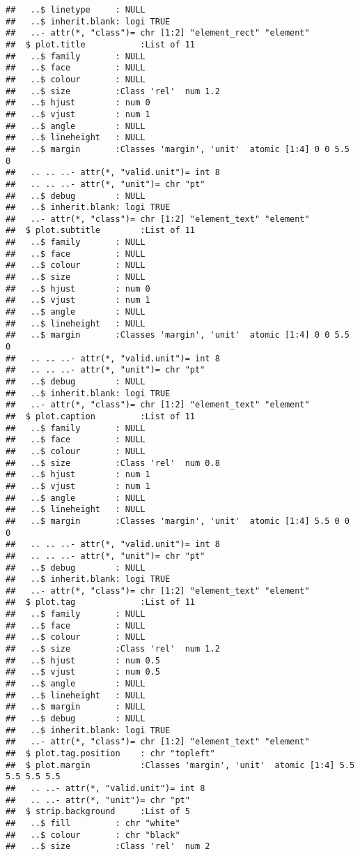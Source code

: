 \documentclass[]{article}
\begin{document}
\begin{verbatim}
##   ..$ linetype     : NULL
##   ..$ inherit.blank: logi TRUE
##   ..- attr(*, "class")= chr [1:2] "element_rect" "element"
##  $ plot.title           :List of 11
##   ..$ family       : NULL
##   ..$ face         : NULL
##   ..$ colour       : NULL
##   ..$ size         :Class 'rel'  num 1.2
##   ..$ hjust        : num 0
##   ..$ vjust        : num 1
##   ..$ angle        : NULL
##   ..$ lineheight   : NULL
##   ..$ margin       :Classes 'margin', 'unit'  atomic [1:4] 0 0 5.5 0
##   .. .. ..- attr(*, "valid.unit")= int 8
##   .. .. ..- attr(*, "unit")= chr "pt"
##   ..$ debug        : NULL
##   ..$ inherit.blank: logi TRUE
##   ..- attr(*, "class")= chr [1:2] "element_text" "element"
##  $ plot.subtitle        :List of 11
##   ..$ family       : NULL
##   ..$ face         : NULL
##   ..$ colour       : NULL
##   ..$ size         : NULL
##   ..$ hjust        : num 0
##   ..$ vjust        : num 1
##   ..$ angle        : NULL
##   ..$ lineheight   : NULL
##   ..$ margin       :Classes 'margin', 'unit'  atomic [1:4] 0 0 5.5 0
##   .. .. ..- attr(*, "valid.unit")= int 8
##   .. .. ..- attr(*, "unit")= chr "pt"
##   ..$ debug        : NULL
##   ..$ inherit.blank: logi TRUE
##   ..- attr(*, "class")= chr [1:2] "element_text" "element"
##  $ plot.caption         :List of 11
##   ..$ family       : NULL
##   ..$ face         : NULL
##   ..$ colour       : NULL
##   ..$ size         :Class 'rel'  num 0.8
##   ..$ hjust        : num 1
##   ..$ vjust        : num 1
##   ..$ angle        : NULL
##   ..$ lineheight   : NULL
##   ..$ margin       :Classes 'margin', 'unit'  atomic [1:4] 5.5 0 0 0
##   .. .. ..- attr(*, "valid.unit")= int 8
##   .. .. ..- attr(*, "unit")= chr "pt"
##   ..$ debug        : NULL
##   ..$ inherit.blank: logi TRUE
##   ..- attr(*, "class")= chr [1:2] "element_text" "element"
##  $ plot.tag             :List of 11
##   ..$ family       : NULL
##   ..$ face         : NULL
##   ..$ colour       : NULL
##   ..$ size         :Class 'rel'  num 1.2
##   ..$ hjust        : num 0.5
##   ..$ vjust        : num 0.5
##   ..$ angle        : NULL
##   ..$ lineheight   : NULL
##   ..$ margin       : NULL
##   ..$ debug        : NULL
##   ..$ inherit.blank: logi TRUE
##   ..- attr(*, "class")= chr [1:2] "element_text" "element"
##  $ plot.tag.position    : chr "topleft"
##  $ plot.margin          :Classes 'margin', 'unit'  atomic [1:4] 5.5 5.5 5.5 5.5
##   .. ..- attr(*, "valid.unit")= int 8
##   .. ..- attr(*, "unit")= chr "pt"
##  $ strip.background     :List of 5
##   ..$ fill         : chr "white"
##   ..$ colour       : chr "black"
##   ..$ size         :Class 'rel'  num 2

\end{verbatim}
\end{document}
